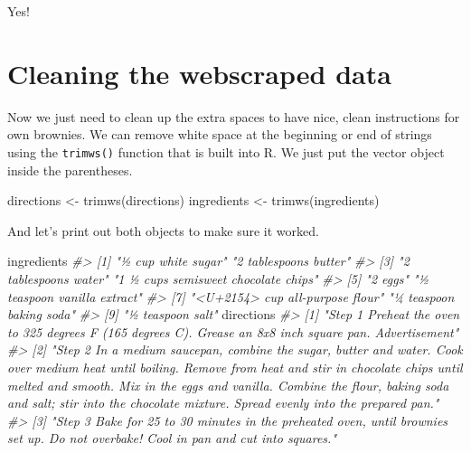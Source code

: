 \documentclass[
]{krantz}
\makeatletter
\newenvironment{Shaded}{\begin{snugshade}}{\end{snugshade}}
\newcommand{\CommentTok}[1]{\textcolor[rgb]{0.37,0.37,0.37}{\textit{#1}}}
\newcommand{\FunctionTok}[1]{\textcolor[rgb]{0,0,0}{#1}}
\newcommand{\NormalTok}[1]{#1}
\newcommand{\OtherTok}[1]{\textcolor[rgb]{0.37,0.37,0.37}{#1}}
\newenvironment{kframe}{%
\medskip{}
\setlength{\fboxsep}{.8em}
 \def\at@end@of@kframe{}%
 \ifinner\ifhmode%
  \def\at@end@of@kframe{\end{minipage}}%
  \begin{minipage}{\columnwidth}%
 \fi\fi%
 \def\FrameCommand##1{\hskip\@totalleftmargin \hskip-\fboxsep
 \colorbox{shadecolor}{##1}\hskip-\fboxsep
     \hskip-\linewidth \hskip-\@totalleftmargin \hskip\columnwidth}%
 \MakeFramed {\advance\hsize-\width
   \@totalleftmargin\z@ \linewidth\hsize
   \@setminipage}}%
 {\par\unskip\endMakeFramed%
 \at@end@of@kframe}
\renewenvironment{Shaded}{\begin{kframe}}{\end{kframe}}
\makeatother
\begin{document}
Yes!

\hypertarget{cleaning-the-webscraped-data}{%
\section{Cleaning the webscraped data}\label{cleaning-the-webscraped-data}}

Now we just need to clean up the extra spaces to have nice, clean instructions for own brownies. We can remove white space at the beginning or end of strings using the \texttt{trimws()} function that is built into R. We just put the vector object inside the parentheses.

\begin{Shaded}
\begin{Highlighting}[]
\NormalTok{directions  }\OtherTok{\textless{}{-}} \FunctionTok{trimws}\NormalTok{(directions)}
\NormalTok{ingredients }\OtherTok{\textless{}{-}} \FunctionTok{trimws}\NormalTok{(ingredients)}
\end{Highlighting}
\end{Shaded}

And let's print out both objects to make sure it worked.

\begin{Shaded}
\begin{Highlighting}[]
\NormalTok{ingredients}
\CommentTok{\#\textgreater{} [1] "½ cup white sugar"                  "2 tablespoons butter"              }
\CommentTok{\#\textgreater{} [3] "2 tablespoons water"                "1 ½ cups semisweet chocolate chips"}
\CommentTok{\#\textgreater{} [5] "2 eggs"                             "½ teaspoon vanilla extract"        }
\CommentTok{\#\textgreater{} [7] "\textless{}U+2154\textgreater{} cup all{-}purpose flour"     "¼ teaspoon baking soda"            }
\CommentTok{\#\textgreater{} [9] "½ teaspoon salt"}
\NormalTok{directions}
\CommentTok{\#\textgreater{} [1] "Step 1   Preheat the oven to 325 degrees F (165 degrees C). Grease an 8x8 inch square pan.    Advertisement"                                                                                                                                                                                                               }
\CommentTok{\#\textgreater{} [2] "Step 2   In a medium saucepan, combine the sugar, butter and water. Cook over medium heat until boiling. Remove from heat and stir in chocolate chips until melted and smooth. Mix in the eggs and vanilla. Combine the flour, baking soda and salt; stir into the chocolate mixture. Spread evenly into the prepared pan."}
\CommentTok{\#\textgreater{} [3] "Step 3   Bake for 25 to 30 minutes in the preheated oven, until brownies set up. Do not overbake! Cool in pan and cut into squares."}
\end{Highlighting}
\end{Shaded}
\end{document}
